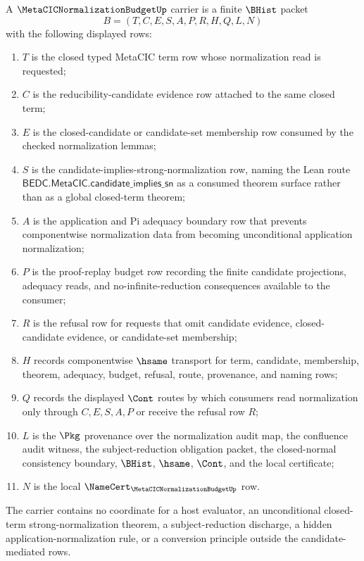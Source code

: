\begin{definition}
\label{def:metacic-normalization-budget-carrier}
A $\MetaCICNormalizationBudgetUp$ carrier is a finite $\BHist$ packet
$$
B=(T,C,E,S,A,P,R,H,Q,L,N)
$$
with the following displayed rows:
\begin{enumerate}
\item $T$ is the closed typed MetaCIC term row whose normalization read is requested;
\item $C$ is the reducibility-candidate evidence row attached to the same closed term;
\item $E$ is the closed-candidate or candidate-set membership row consumed by the checked normalization lemmas;
\item $S$ is the candidate-implies-strong-normalization row, naming the Lean route $\mathsf{BEDC.MetaCIC.candidate\_implies\_sn}$ as a consumed theorem surface rather than as a global closed-term theorem;
\item $A$ is the application and Pi adequacy boundary row that prevents componentwise normalization data from becoming unconditional application normalization;
\item $P$ is the proof-replay budget row recording the finite candidate projections, adequacy reads, and no-infinite-reduction consequences available to the consumer;
\item $R$ is the refusal row for requests that omit candidate evidence, closed-candidate evidence, or candidate-set membership;
\item $H$ records componentwise $\hsame$ transport for term, candidate, membership, theorem, adequacy, budget, refusal, route, provenance, and naming rows;
\item $Q$ records the displayed $\Cont$ routes by which consumers read normalization only through $C,E,S,A,P$ or receive the refusal row $R$;
\item $L$ is the $\Pkg$ provenance over the normalization audit map, the confluence audit witness, the subject-reduction obligation packet, the closed-normal consistency boundary, $\BHist$, $\hsame$, $\Cont$, and the local certificate;
\item $N$ is the local $\NameCert_{\MetaCICNormalizationBudgetUp}$ row.
\end{enumerate}
The carrier contains no coordinate for a host evaluator, an unconditional closed-term strong-normalization theorem, a subject-reduction discharge, a hidden application-normalization rule, or a conversion principle outside the candidate-mediated rows.
\end{definition}

